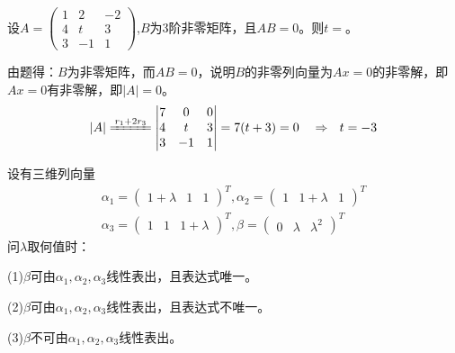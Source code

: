\documentclass[a4paper]{report}
\begin{document}
\EX 设$A=
\begin{pmatrix}
1&2&-2\\
4&t&3\\
3&-1&1
\end{pmatrix}
$,$B$为3阶非零矩阵，且$AB=0$。则$t=$\underline{\hphantom{~~~~~~~~}}。

\begin{jie}
由题得：$B$为非零矩阵，而$AB=0$，说明$B$的非零列向量为$Ax=0$的非零解，即$Ax=0$有非零解，即$|A|=0$。
\begin{equation*}
|A|\xlongequal{r_1+2r_3}
\begin{vmatrix}
7&0&0\\
4&t&3\\
3&-1&1
\end{vmatrix}=7(t+3)=0~~~\Rightarrow~~t=-3
\end{equation*}
\end{jie}

\EX 设有三维列向量
\begin{gather*}
\alpha_1=
\begin{pmatrix}
1+\lambda&1&1
\end{pmatrix}^T,\alpha_2=
\begin{pmatrix}
1&1+\lambda&1
\end{pmatrix}^T\\
\alpha_3=
\begin{pmatrix}
1&1&1+\lambda
\end{pmatrix}^T,\beta=
\begin{pmatrix}
0&\lambda&\lambda^2
\end{pmatrix}^T
\end{gather*}
问$\lambda$取何值时：

(1)$\beta$可由$\alpha_1,\alpha_2,\alpha_3$线性表出，且表达式唯一。

(2)$\beta$可由$\alpha_1,\alpha_2,\alpha_3$线性表出，且表达式不唯一。

(3)$\beta$不可由$\alpha_1,\alpha_2,\alpha_3$线性表出。
\end{document}
